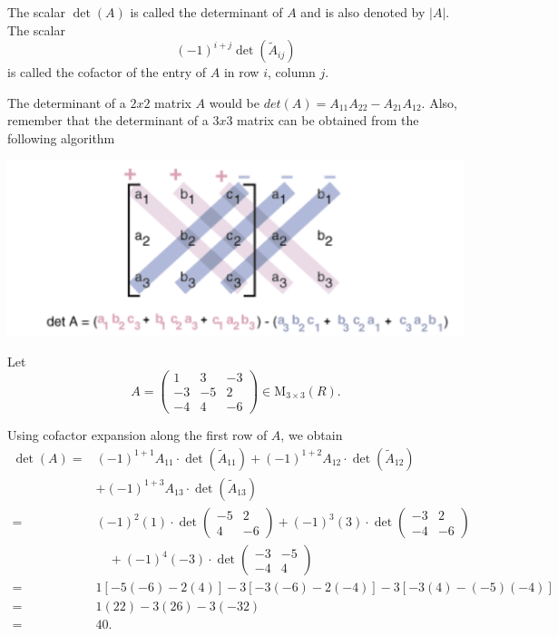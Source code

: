 \documentclass{report}
\begin{document}
    The scalar $\operatorname{det}(A)$ is called the determinant of $A$ and is also denoted by $|A|$. The scalar
    $$
    (-1)^{i+j} \operatorname{det}\left(\tilde{A}_{i j}\right)
    $$
    is called the cofactor of the entry of $A$ in row $i$, column $j$.

    The determinant of a $2x2$ matrix $A$ would be $det(A) = A_{11}A_{22} - A_{21}A_{12}$. Also, remember that the determinant of a $3x3$ matrix can be obtained from the following algorithm
    \begin{center}
        \includegraphics[width=1\textwidth]{images/3x3det.png}
    \end{center}

    \begin{Example}
        Let
        $$
        A=\left(\begin{array}{rrr}
        1 & 3 & -3 \\
        -3 & -5 & 2 \\
        -4 & 4 & -6
        \end{array}\right) \in \mathrm{M}_{3 \times 3}(R) .
        $$

        Using cofactor expansion along the first row of $A$, we obtain
        $$
        \begin{aligned}
        \operatorname{det}(A)= & (-1)^{1+1} A_{11} \cdot \operatorname{det}\left(\tilde{A}_{11}\right)+(-1)^{1+2} A_{12} \cdot \operatorname{det}\left(\tilde{A}_{12}\right) \\
        & +(-1)^{1+3} A_{13} \cdot \operatorname{det}\left(\tilde{A}_{13}\right) \\
        = & (-1)^2(1) \cdot \operatorname{det}\left(\begin{array}{rr}
        -5 & 2 \\
        4 & -6
        \end{array}\right)+(-1)^3(3) \cdot \operatorname{det}\left(\begin{array}{rr}
        -3 & 2 \\
        -4 & -6
        \end{array}\right) \\
        & \quad+(-1)^4(-3) \cdot \operatorname{det}\left(\begin{array}{rr}
        -3 & -5 \\
        -4 & 4
        \end{array}\right) \\
        = & 1[-5(-6)-2(4)]-3[-3(-6)-2(-4)]-3[-3(4)-(-5)(-4)] \\
        = & 1(22)-3(26)-3(-32) \\
        = & 40 .
        \end{aligned}
        $$
    \end{Example}
\end{document}

